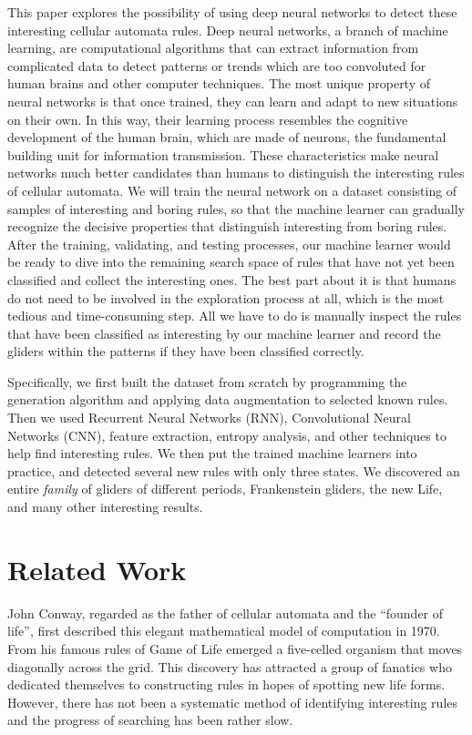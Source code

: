 \documentclass[12pt]{article}
\numberwithin{figure}{section} %
\begin{document}
This paper explores the possibility of using deep neural networks to detect these interesting cellular automata rules. Deep neural networks, a branch of machine learning, are computational algorithms that can extract information from complicated data to detect patterns or trends which are too convoluted for human brains and other computer techniques. The most unique property of neural networks is that once trained, they can learn and adapt to new situations on their own. In this way, their learning process resembles the cognitive development of the human brain, which are made of neurons, the fundamental building unit for information transmission. These characteristics make neural networks much better candidates than humans to distinguish the interesting rules of cellular automata. We will train the neural network on a dataset consisting of samples of interesting and boring rules, so that the machine learner can gradually recognize the decisive properties that distinguish interesting from boring rules. After the training, validating, and testing processes, our machine learner would be ready to dive into the remaining search space of rules that have not yet been classified and collect the interesting ones. The best part about it is that humans do not need to be involved in the exploration process at all, which is the most tedious and time-consuming step. All we have to do is manually inspect the rules that have been classified as interesting by our machine learner and record the gliders within the patterns if they have been classified correctly. 

Specifically, we first built the dataset from scratch by programming the generation algorithm and applying data augmentation to selected known rules. Then we used Recurrent Neural Networks (RNN), Convolutional Neural Networks (CNN), feature extraction, entropy analysis, and other techniques to help find interesting rules. We then put the trained machine learners into practice, and detected several new rules with only three states. We discovered an entire \textit{family} of gliders of different periods, Frankenstein gliders, the new Life, and many other interesting results.

\newpage
\section{Related Work}
\label{Related Work}
John Conway, regarded as the father of cellular automata and the “founder of life”, first described this elegant mathematical model of computation in 1970. From his famous rules of Game of Life emerged a five-celled organism that moves diagonally across the grid. This discovery has attracted a group of fanatics who dedicated themselves to constructing rules in hopes of spotting new life forms. However, there has not been a systematic method of identifying interesting rules and the progress of searching has been rather slow. 
\end{document}

